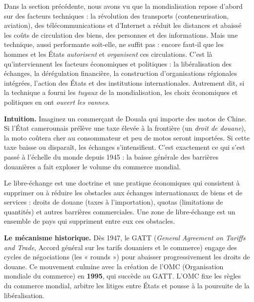 \documentclass[11pt]{article}
\newcommand{\cle}[1]{{\popxbold\color{popdark}#1}}
\newcounter{popsec}
\newcounter{popsub}
\newcommand{\courssub}[1]{%
  \stepcounter{popsub}%
  \par\vspace{9pt}\noindent{\popxbold\fontsize{11.5}{13}\selectfont\color{popink}{\color{poporange}\thepopsec.\thepopsub}\hspace{6pt}#1}\par\nopagebreak\vspace{4pt}
}
\begin{document}
Dans la section précédente, nous avons vu que la mondialisation repose d'abord sur des \cle{facteurs techniques} : la révolution des transports (conteneurisation, aviation), des télécommunications et d'Internet a réduit les distances et abaissé les coûts de circulation des biens, des personnes et des informations. Mais une technique, aussi performante soit-elle, ne suffit pas : encore faut-il que les hommes et les États \emph{autorisent} et \emph{organisent} ces circulations. C'est là qu'interviennent les \cle{facteurs économiques et politiques} : la libéralisation des échanges, la dérégulation financière, la construction d'organisations régionales intégrées, l'action des États et des institutions internationales. Autrement dit, si la technique a fourni les \emph{tuyaux} de la mondialisation, les choix économiques et politiques en ont \emph{ouvert les vannes}.

\courssub{La libéralisation des échanges}

\textbf{Intuition.} Imaginez un commerçant de Douala qui importe des motos de Chine. Si l'État camerounais prélève une taxe élevée à la frontière (un \emph{droit de douane}), la moto coûtera cher au consommateur et peu de motos seront importées. Si cette taxe baisse ou disparaît, les échanges s'intensifient. C'est exactement ce qui s'est passé à l'échelle du monde depuis 1945 : la baisse générale des barrières douanières a fait exploser le volume du commerce mondial.

\begin{definition}
Le \cle{libre-échange} est une doctrine et une pratique économiques qui consistent à supprimer ou à réduire les obstacles aux échanges internationaux de biens et de services : droits de douane (taxes à l'importation), quotas (limitations de quantités) et autres barrières commerciales. Une \cle{zone de libre-échange} est un ensemble de pays qui suppriment entre eux ces obstacles.
\end{definition}

\textbf{Le mécanisme historique.} Dès 1947, le GATT (\emph{General Agreement on Tariffs and Trade}, Accord général sur les tarifs douaniers et le commerce) engage des cycles de négociations (les « rounds ») pour abaisser progressivement les droits de douane. Ce mouvement culmine avec la création de l'\cle{OMC} (Organisation mondiale du commerce) en \textbf{1995}, qui succède au GATT. L'OMC fixe les règles du commerce mondial, arbitre les litiges entre États et pousse à la poursuite de la libéralisation.
\end{document}
